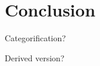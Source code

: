 \chapter*{Conclusion}
\label{ch:Conclusion}

Categorification?

Derived version?

\endinput

Any text after an \endinput is ignored.
You could put scraps here or things in progress.
